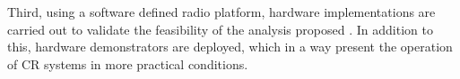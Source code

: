 Third, using a software defined radio platform, hardware implementations are carried out to validate the feasibility of the analysis proposed \cite{Kaushik13, Kaushik15_D, Kaushik16_CC}. In addition to this, hardware demonstrators are deployed, which in a way present the operation of CR systems in more practical conditions.

